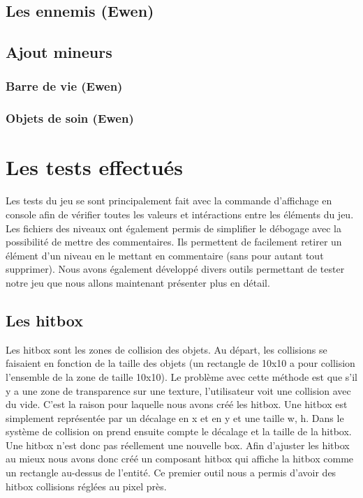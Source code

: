 \documentclass{article}
\begin{document}
\subsection{Les ennemis (Ewen)}
\subsection{Ajout mineurs}
\subsubsection{Barre de vie (Ewen)}
\subsubsection{Objets de soin (Ewen)}

\section{Les tests effectués}

Les tests du jeu se sont principalement fait avec la commande d'affichage en console afin de vérifier 
toutes les valeurs et intéractions entre les éléments du jeu. Les fichiers des niveaux ont également 
permis de simplifier le débogage avec la possibilité de mettre des commentaires. Ils permettent de 
facilement retirer un élément d'un niveau en le mettant en commentaire (sans pour autant tout supprimer).
Nous avons également développé divers outils permettant de tester notre jeu que nous allons maintenant 
présenter plus en détail. 

\subsection{Les hitbox}
Les hitbox sont les zones de collision des objets. Au départ, les collisions se faisaient en fonction de 
la taille des objets (un rectangle de 10x10 a pour collision l'ensemble de la zone de taille 10x10). Le 
problème avec cette méthode est que s'il y a une zone de transparence sur une texture, l'utilisateur voit 
une collision avec du vide. C'est la raison pour laquelle nous avons créé les hitbox. Une hitbox est 
simplement représentée par un décalage en x et en y et une taille w, h. Dans le système de collision on 
prend ensuite compte le décalage et la taille de la hitbox. Une hitbox n'est donc pas réellement une 
nouvelle box. Afin d'ajuster les hitbox au mieux nous avons donc créé un composant hitbox qui affiche 
la hitbox comme un rectangle au-dessus de l'entité. Ce premier outil nous a permis d'avoir des hitbox 
collisions réglées au pixel près.
\end{document}
